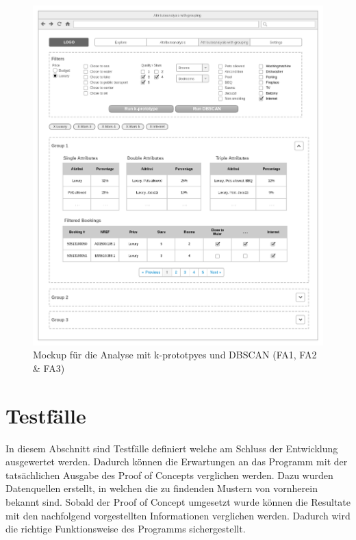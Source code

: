 \begin{figure}[H]
	\RawFloats
	\centering
	\includegraphics[width=1\textwidth]{images/wireframe-clustering}
	\caption{Mockup für die Analyse mit k-prototpyes und DBSCAN (FA1, FA2 \& FA3)}
	\label{fig:konzept:mockups:apriori}
\end{figure}

\section{Testfälle}
\label{sec:recherche:testcases}

%

In diesem Abschnitt sind Testfälle definiert welche am Schluss der Entwicklung ausgewertet werden. Dadurch können die Erwartungen an das Programm mit der tatsächlichen Ausgabe des Proof of Concepts verglichen werden. Dazu wurden Datenquellen erstellt, in welchen die zu findenden Mustern von vornherein bekannt sind. Sobald der Proof of Concept umgesetzt wurde können die Resultate mit den  nachfolgend vorgestellten Informationen verglichen werden. Dadurch wird die richtige Funktionsweise des Programms sichergestellt.

